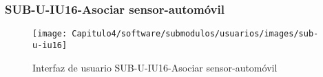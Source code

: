 \subsubsection{SUB-U-IU16-Asociar sensor-automóvil}\label{SUB-U-IU16}
\begin{figure}[H]
	\centering
	\texttt{[image: Capitulo4/software/submodulos/usuarios/images/sub-u-iu16]}
	\caption{Interfaz de usuario SUB-U-IU16-Asociar sensor-automóvil}
	\label{fig:sub-u-iu16}
\end{figure}